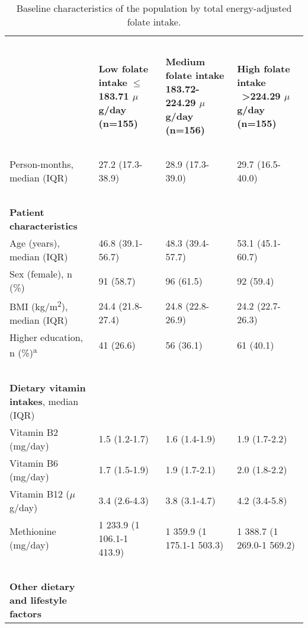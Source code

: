 \begin{table}
\caption{Baseline characteristics of the population by total energy-adjusted folate intake.}
\label{table6_1}
\begin{adjustbox}{width=\textwidth}
\begin{tabular}{L{4.8cm}C{3.5cm}C{3.5cm}C{3.5cm}}

\hline

~ & ~ & ~ & ~\\
~ & {\bfseries Low folate intake} {\bfseries ${\leq}$183.71 $\mu$g/day} \bfseries (n=155) & {\bfseries Medium folate intake} \bfseries 183.72-224.29 $\mu$g/day (n=156) & {\bfseries High folate intake} \ {\bfseries {\textgreater}224.29 $\mu$g/day} \bfseries (n=155)\\
~ & ~ & ~ & ~\\
\hline

Person-months, median (IQR) & 27.2 (17.3-38.9) & 28.9 (17.3-39.0) & 29.7 (16.5-40.0)\\
~ & ~ & ~ & ~\\
\bfseries Patient characteristics & ~ & ~ & ~ \\

{Age (years), median (IQR)} & 46.8 (39.1-56.7) & 48.3 (39.4-57.7) & 53.1 (45.1-60.7)\\
 Sex (female), n (\%) & 91 (58.7) & 96 (61.5) & 92 (59.4)\\
 {BMI (kg/m}{\textsuperscript{2}}{), median (IQR)} & 24.4 (21.8-27.4) & 24.8 (22.8-26.9) & 24.2 (22.7-26.3)\\
{Higher education, n (\%)}\textsuperscript{a} & 41 (26.6) & 56 (36.1) & 61 (40.1)\\

~ & ~ & ~ & ~\\
{\textbf{Dietary vitamin intakes}}{, median (IQR)} & ~ & ~ & ~ \\
 Vitamin B2 (mg/day) & 1.5 (1.2-1.7) & 1.6 (1.4-1.9) & 1.9 (1.7-2.2)\\
 Vitamin B6 (mg/day) & 1.7 (1.5-1.9) & 1.9 (1.7-2.1) & 2.0 (1.8-2.2)\\
 Vitamin B12 ($\mu$g/day) & 3.4 (2.6-4.3) & 3.8 (3.1-4.7) & 4.2 (3.4-5.8)\\
 Methionine (mg/day) & 1 233.9 (1 106.1-1 413.9) & 1 359.9 (1 175.1-1 503.3) & 1 388.7 (1 269.0-1 569.2)\\
~ & ~ & ~ & ~\\

\bfseries Other dietary and lifestyle factors & ~ & ~ & ~ \\


\end{tabular}
\end{adjustbox}
\end{table}
